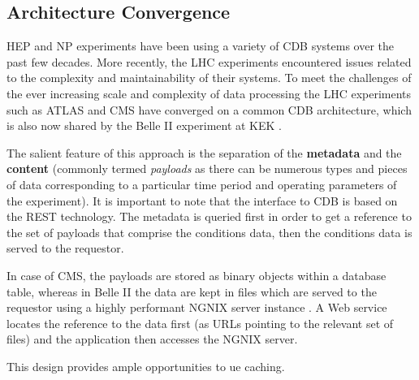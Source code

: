 \documentclass[pdftex,12pt,letter]{article}
\begin{document}
\subsection{Architecture Convergence}
HEP and NP experiments have been using a variety of CDB systems over the past few decades.
More recently, the LHC experiments encountered issues related to the complexity and
maintainability of their systems\cite{func_test}. To meet the challenges of the ever increasing scale
and complexity of data processing the LHC experiments such as ATLAS and CMS have converged on
a common CDB architecture, which is also now shared by the Belle II experiment at KEK \cite{b2cdb}.

The salient feature of this approach is the separation of the \textbf{metadata} and the \textbf{content}
(commonly termed \textit{payloads} as there can be numerous types and pieces of data corresponding
to a particular time period and operating parameters of the experiment). It is important to note that
the interface to CDB is based on the REST technology. The metadata is queried first in order to
get a reference to the set of payloads that comprise the conditions data, then the conditions data
is served to the requestor.

In case of CMS, the payloads are stored as binary objects within a database table, whereas in Belle II
the data are kept in files which are served to the requestor using a highly performant NGNIX server instance
\cite{nginx}. A Web service locates the reference to the data first (as URLs pointing to the relevant set of files)
and the application then accesses the NGNIX server.

This design provides ample opportunities to ue caching.




\end{document}
